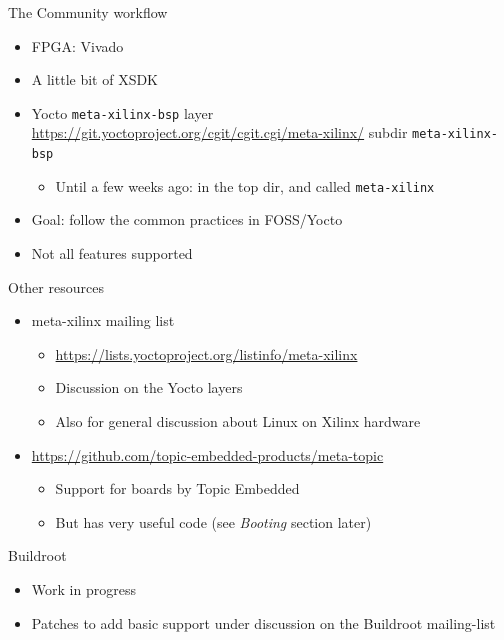 \documentclass[xetex,table]{beamer}
\begin{document}
\begin{frame}{The Community workflow}
  \begin{itemize}
  \item FPGA: Vivado
  \item A little bit of XSDK
  \item Yocto {\tt meta-xilinx-bsp} layer\\
    {\footnotesize\url{https://git.yoctoproject.org/cgit/cgit.cgi/meta-xilinx/}}
    subdir {\tt meta-xilinx-bsp}
    \begin{itemize}
      \item Until a few weeks ago: in the top dir, and called {\tt meta-xilinx}
  \end{itemize}
  \item Goal: follow the common practices in FOSS/Yocto
  \item Not all features supported
  \end{itemize}
\end{frame}

\begin{frame}{Other resources}
  \begin{itemize}
  \item meta-xilinx mailing list
    \begin{itemize}
    \item {\footnotesize\url{https://lists.yoctoproject.org/listinfo/meta-xilinx}}
    \item Discussion on the Yocto layers
    \item Also for general discussion about Linux on Xilinx
      hardware
    \end{itemize}
  \item {\small\url{https://github.com/topic-embedded-products/meta-topic}}
    \begin{itemize}
    \item Support for boards by Topic Embedded
    \item But has very useful code (see {\em Booting} section later)
    \end{itemize}
  \end{itemize}
\end{frame}

\begin{frame}{Buildroot}
  \begin{itemize}
  \item Work in progress
  \item Patches to add basic support under discussion on the Buildroot
    mailing-list
  \end{itemize}
\end{frame}
\end{document}
